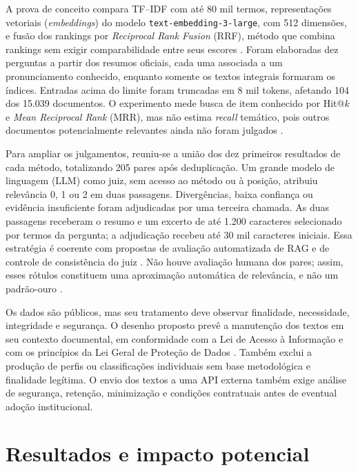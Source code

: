 \documentclass[12pt,a4paper]{article}
\begin{document}
A prova de conceito compara TF--IDF com até 80 mil termos, representações
vetoriais (\textit{embeddings}) do modelo \texttt{text-embedding-3-large}, com
512 dimensões, e fusão dos rankings por
\textit{Reciprocal Rank Fusion} (RRF), método que combina rankings sem exigir
comparabilidade entre seus escores \cite{cormackEtAl2009rrf}. Foram elaboradas dez perguntas a partir
dos resumos oficiais, cada uma associada a um pronunciamento conhecido, enquanto
somente os textos integrais formaram os índices. Entradas acima do limite foram
truncadas em 8 mil tokens, afetando 104 dos 15.039 documentos. O experimento
mede busca de item conhecido por Hit@$k$ e \textit{Mean Reciprocal Rank} (MRR),
mas não estima \textit{recall} temático, pois outros documentos potencialmente
relevantes ainda não foram julgados \cite{manningEtAl2008informationRetrieval}.

Para ampliar os julgamentos, reuniu-se a união dos dez primeiros resultados de
cada método, totalizando 205 pares após deduplicação. Um grande modelo de
linguagem (LLM) como juiz, sem
acesso ao método ou à posição, atribuiu relevância 0, 1 ou 2 em duas passagens.
Divergências, baixa confiança ou evidência insuficiente foram adjudicadas por
uma terceira chamada. As duas passagens receberam o resumo e um excerto de até
1.200 caracteres selecionado por termos da pergunta; a adjudicação recebeu até
30 mil caracteres iniciais. Essa estratégia é coerente com propostas
de avaliação automatizada de RAG e de controle de consistência do juiz
\cite{saadFalconEtAl2024ares,liuEtAl2025judgeRag}. Não houve avaliação humana dos
pares; assim, esses rótulos constituem uma aproximação automática de relevância,
e não um padrão-ouro \cite{chenEtAl2024judgeBias}.

Os dados são públicos, mas seu tratamento deve observar finalidade,
necessidade, integridade e segurança. O desenho proposto prevê a manutenção dos
textos em seu contexto documental, em conformidade com a Lei de Acesso à
Informação \cite{brasil2011lai} e com os princípios da Lei Geral de Proteção de
Dados \cite{brasil2018lgpd}. Também exclui a produção de perfis ou classificações
individuais sem base metodológica e finalidade legítima. O envio dos textos a
uma API externa também exige análise de segurança, retenção, minimização e
condições contratuais antes de eventual adoção institucional.

\section{Resultados e impacto potencial}
\end{document}
